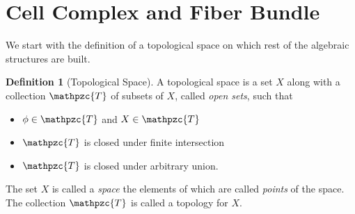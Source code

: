 \documentclass[11pt, reqno]{amsart}
\newcommand{\script}[1]{\mathpzc{#1}}
\theoremstyle{definition}
\newtheorem{dfn}{Definition}
\begin{document}



\section{Cell Complex and Fiber Bundle}

We start with the definition of a topological space on which rest of
the algebraic structures are built.
\begin{dfn}[Topological Space]
  A topological space is a set $X$ along with a collection
  $\script{T}$ of subsets of $X$, called \emph{open sets}, such that
  \begin{itemize}
  \item $\phi \in \script{T}$ and $X \in \script{T}$
  \item $\script{T}$ is closed under finite intersection
  \item $\script{T}$ is closed under arbitrary union.
  \end{itemize}
\end{dfn}
The set $X$ is called a \emph{space} the elements of which are called
\emph{points} of the space. The collection $\script{T}$ is called a
topology for $X$.
\end{document}
